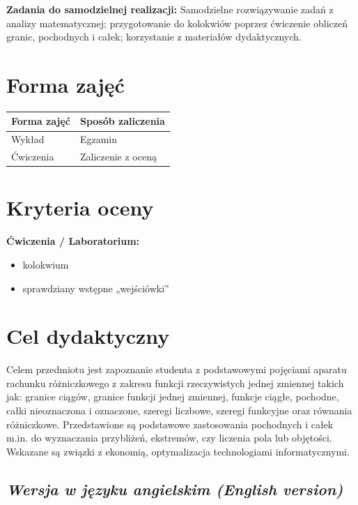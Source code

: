 \documentclass[12pt, a4paper]{article}
\newcommand{\thdrule}{\noalign{\global\setlength{\extrarowheight}{0pt}}}
\newcommand{\thdend}{\noalign{\global\setlength{\extrarowheight}{3pt}}}
\begin{document}
\vspace{4pt}
\noindent\textbf{Zadania do samodzielnej realizacji:} Samodzielne rozwiązywanie zadań z analizy matematycznej; przygotowanie do kolokwiów poprzez ćwiczenie obliczeń granic, pochodnych i całek; korzystanie z materiałów dydaktycznych.

\section{Forma zajęć}

\begin{center}
{\scriptsize
\begin{tabular}{m{5cm}m{8cm}}
\thdrule\toprule
\rowcolor{pjatkRed} {\color{white}\textbf{Forma zajęć}} & {\color{white}\textbf{Sposób zaliczenia}} \\
\midrule\thdend
  \rowcolor{tableRowLight} Wykład & Egzamin \\
  \rowcolor{tableRowAlt} Ćwiczenia & Zaliczenie z oceną \\
\bottomrule
\end{tabular}}
\end{center}

\section{Kryteria oceny}

\textbf{Ćwiczenia / Laboratorium:}
\begin{itemize}
  \item kolokwium
  \item sprawdziany wstępne „wejściówki''
\end{itemize}


\section{Cel dydaktyczny}

Celem przedmiotu jest zapoznanie studenta z podstawowymi pojęciami aparatu rachunku różniczkowego z zakresu funkcji rzeczywistych jednej zmiennej takich jak: granice ciągów, granice funkcji jednej zmiennej, funkcje ciągłe, pochodne, całki nieoznaczona i oznaczone, szeregi liczbowe, szeregi funkcyjne oraz równania różniczkowe. Przedstawione są podstawowe zastosowania  pochodnych i całek m.in. do wyznaczania przybliżeń, ekstremów,  czy  liczenia pola lub objętości. Wskazane są związki z ekonomią, optymalizacja technologiami  informatycznymi.

\subsection*{\textit{Wersja w języku angielskim (English version)}}
\end{document}
